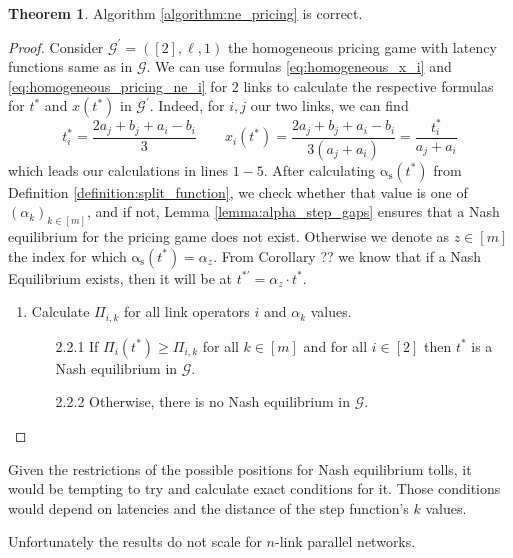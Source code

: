 \documentclass[10pt,a4paper]{book}
\newcommand{\as}{\mathrm{\alpha_s}}
\newcommand{\Gm}{\mathcal{G}}
\theoremstyle{definition}
\newtheorem{theorem}[definition]{Theorem}
\newtheorem{lemma}[definition]{Lemma}
\theoremstyle{comment}
\begin{document}
\begin{theorem}
	Algorithm \ref{algorithm:ne_pricing} is correct.
\end{theorem}

\begin{proof}
	Consider $\Gm^\prime = ([2], \ell, 1)$ the homogeneous pricing game with latency functions same as in $\Gm$.
	We can use formulas \ref{eq:homogeneous_x_i} and \ref{eq:homogeneous_pricing_ne_i} for $2$ links to calculate the respective formulas for $t^*$ and $x(t^*)$ in $\Gm^\prime$.
	Indeed, for $i, j$ our two links, we can find
	\[
		t_i^* = \frac{2 a_j + b_j + a_i - b_i}{3} \qquad x_i(t^*) = \frac{2 a_j + b_j + a_i - b_i}{3(a_j + a_i)} = \frac{t_i^*}{a_j + a_i}
	\]
	which leads our calculations in lines $1-5$.
	After calculating $\as(t^*)$ from Definition \ref{definition:split_function}, we check whether that value is one of $(\alpha_k)_{k \in [m]}$, and if not, Lemma \ref{lemma:alpha_step_gaps} ensures that a Nash equilibrium for the pricing game does not exist.
	Otherwise we denote as $z \in [m]$ the index for which $\as(t^*) = \alpha_z$.
	From Corollary ?? we know that if a Nash Equilibrium exists, then it will be at $t^{*\prime} = \alpha_z \cdot t^*$.
	\begin{enumerate}
		\item Calculate $\Pi_{i, k}$ for all link operators $i$ and $\alpha_k$ values.
		\begin{enumerate}
			\item[2.2.1] If $\Pi_i(t^*) \ge \Pi_{i, k}$ for all $k \in [m]$ and for all $i \in [2]$ then $t^*$ is a Nash equilibrium in $\Gm$.
			\item[2.2.2] Otherwise, there is no Nash equilibrium in $\Gm$.
		\end{enumerate}
	\end{enumerate}
\end{proof}

Given the restrictions of the possible positions for Nash equilibrium tolls, it would be tempting to try and calculate exact conditions for it.
Those conditions would depend on latencies and the distance of the step function's $k$ values.

Unfortunately the results do not scale for $n$-link parallel networks.

\end{document}
